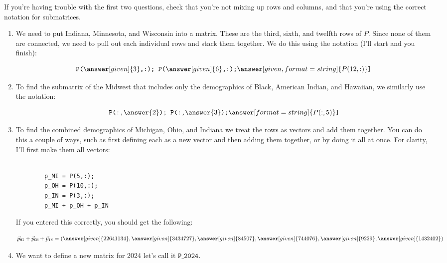 \documentclass{ximera}
\begin{document}
\begin{exploration}
\begin{example}
\begin{hint}

  If you're having trouble with the first two questions, check that you're not mixing up rows and columns, and that you're using the correct notation for submatrices.

\end{hint}

\begin{solution}
  \begin{enumerate}
  \item We need to put Indiana, Minnesota, and Wisconsin into a matrix. These are the third, sixth, and twelfth rows of $P$. Since none of them are connected, we need to pull out each individual rows and stack them together. We do this using the notation (I'll start and you finish):

    \[
    \texttt{P(}\answer[given]{3}\texttt{,:); P(}\answer[given]{6}\texttt{,:);}\answer[given,format=string]{P(12,:)}\texttt{]} 
    \]
    \item To find the submatrix of the Midwest that includes only the
      demographics of Black, American Indian, and Hawaiian, we similarly use the notation:

      \[
      \texttt{P(:,}\answer{2}\texttt{); P(:,}\answer{3}\texttt{);}\answer[format=string]{P(:,5)}\texttt{]}
      \]
  \item To find the combined demographics of Michigan, Ohio, and
    Indiana we treat the rows as vectors and add them together. You can do this a couple of ways, such as first defining each as a new vector and then adding them together, or by doing it all at once. For clarity, I'll first make them all vectors:

      \begin{Verbatim}
      
        p_MI = P(5,:);
        p_OH = P(10,:);
        p_IN = P(3,:);
        p_MI + p_OH + p_IN

      \end{Verbatim}

      If you entered this correctly, you should get the following:

    \[
    \vec{p}_{\texttt{MI}} + \vec{p}_{\texttt{OH}} + \vec{p}_{\texttt{IN}} = (\answer[given]{22641134},\answer[given]{3434727},\answer[given]{84507},\answer[given]{744076},\answer[given]{9229},\answer[given]{1432402})
    \]
  \item We want to define a new matrix for 2024 let's call it $\texttt{P\_2024}$.
  

\end{enumerate}
\end{solution}
\end{example}
\end{exploration}
\end{document}
